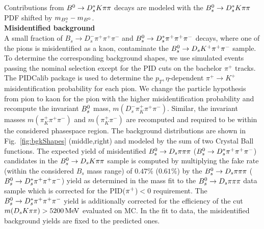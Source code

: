 Contributions from ${{B}^0}\rightarrow D_s^{*}K{\pi}{\pi}$ decays are modeled with the ${{B}^0_{s}}\rightarrow D_s^{*}K{\pi}{\pi}$ PDF  shifted by $m_{{{B}^0_{s}}} - m_{{{B}^0}}$. \\

\noindent\textbf{Misidentified background}  \\
A small fraction of $B_s \to D_s^- \pi^+ \pi^+ \pi^-$ and ${{B}^0_{s}}\rightarrow D_s^{*}\pi^+ \pi^+ \pi^-$ decays, where one of the pions is misidentified as a kaon, contaminate the 
${{B}^0_{s}}\rightarrow D_s K^+ \pi^+ \pi^-$ sample.
To determine the corresponding background shapes, we use simulated events passing the nominal selection
except for the PID cuts on the bachelor $\pi^+$ tracks. 
The \textsf{PIDCalib} package is used to determine the $p_T,\eta$-dependent $\pi^+\rightarrow K^+$ misidentification probability for each pion. 
We change the particle hypothesis from pion to kaon for the pion with the higher misidentification probability and recompute the invariant ${{B}^0_{s}}$ mass, $m(D_s^- \pi^+_K \pi^+ \pi^- )$. 
Similar, the invariant masses $m(\pi^+_K \pi^+ \pi^- )$ and $m(\pi^+_K \pi^-)$ are recomputed and required to be within the considered phasespace region.
The background distributions are shown in Fig.~\ref{fig:bgkShapes} (middle,right) and modeled by the sum of two Crystal Ball functions. 
The expected yield of misidentified ${{B}^0_{s}}\rightarrow{\ensuremath{{D}_{s}}}{\ensuremath{\pi}}{\ensuremath{\pi}}{\ensuremath{\pi}}$ (${{B}^0_{s}}\rightarrow D_s^{*}\pi^+ \pi^+ \pi^-$) candidates in the ${{B}^0_{s}}\rightarrow{\ensuremath{{D}_{s}}} K{\pi}{\pi}$ sample is computed 
by multiplying the fake rate (within the considered $B_s$ mass range) of $0.47\%$ ($0.61\%$) %
by the ${{B}^0_{s}}\rightarrow{\ensuremath{{D}_{s}}}{\ensuremath{\pi}}{\ensuremath{\pi}}{\ensuremath{\pi}}$ (${{B}^0_{s}}\rightarrow D_s^{*}\pi^+ \pi^+ \pi^-$) yield as determined in the mass fit to the ${{B}^0_{s}}\rightarrow{\ensuremath{{D}_{s}}}{\ensuremath{\pi}}{\ensuremath{\pi}}{\ensuremath{\pi}}$ data sample which is 
corrected for the PID(${{\pi}^+}$)$<0$ requirement.  
The ${{B}^0_{s}}\rightarrow D_s^{*}\pi^+ \pi^+ \pi^-$ yield is additionally corrected for the efficiency of the cut $m({{D}_{s}} K{\pi}{\pi})>5200\mathrm{\,Me\kern -0.1em V}$ evaluated on MC.
In the fit to data, the misidentified background yields are fixed to the predicted ones.
